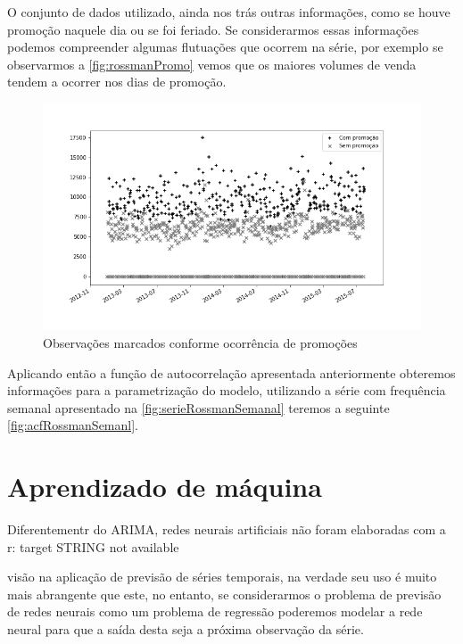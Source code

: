 \documentclass[
    12pt,
    oneside,
    a4paper,
    english,
    brazil
]{abntex2}
\begin{document}
O conjunto de dados utilizado, ainda nos trás outras informações, como se houve
promoção naquele dia ou se foi feriado. Se considerarmos essas informações
podemos compreender algumas flutuações que ocorrem na série, por exemplo se
observarmos a \autoref{fig:rossmanPromo} vemos que os maiores volumes de venda
tendem a ocorrer nos dias de promoção.

\begin{figure}
    \centering
    \caption{Observações marcados conforme ocorrência de promoções}
    \includegraphics[width=.7\textwidth]{images/graficoRossmanPromo.png}
\end{figure}

Aplicando então a função de autocorrelação apresentada anteriormente obteremos
informações para a parametrização do modelo, utilizando a série com frequência
semanal apresentado na \autoref{fig:serieRossmanSemanal} teremos a seguinte
\autoref{fig:acfRossmanSemanl}.


\section{Aprendizado de máquina}

Diferentementr do ARIMA, redes neurais artificiais não foram elaboradas com a
r: target STRING not available

visão na aplicação de previsão de séries temporais, na verdade seu uso é muito
mais abrangente que este, no entanto, se considerarmos o problema de previsão
de redes neurais como um problema de regressão poderemos modelar a rede neural
para que a saída desta seja a próxima observação da série.
\end{document}
